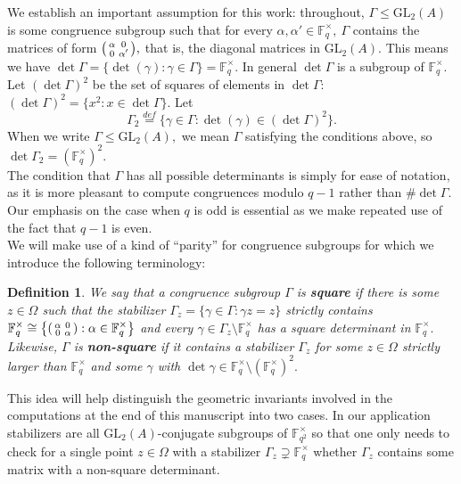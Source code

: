 \documentclass[11pt]{amsart}
\newtheorem{definition}[theorem]{Definition}
\theoremstyle{definition}
\newenvironment{psmallmatrix}
{\left(\begin{smallmatrix}}
	{\end{smallmatrix}\right)}
\numberwithin{equation}{section}
\newcommand{\GL}{\mathrm{GL}} 	%
\newcommand{\bbF}{\mathbb{F}}		%
\begin{document}
		We establish an important assumption for this work:
		throughout, $\Gamma\leq \GL_2(A)$ is some congruence subgroup such that 
		for every $\alpha,\alpha'\in \bbF_q^{\times},~\Gamma$ contains the matrices of form $\displaystyle{\begin{psmallmatrix}\alpha&0\\0&\alpha'\end{psmallmatrix}},$ that is, the diagonal matrices in $\GL_2(A).$ This means we have
		$\det\Gamma=\{\det(\gamma):\gamma\in \Gamma\}=\bbF_q^{\times}.$ In general $\det\Gamma$ is a subgroup of $\bbF_q^{\times}.$\\
		
		Let $(\det\Gamma)^2$ be the set of squares of elements in $\det\Gamma:$ $(\det\Gamma)^2=\{x^2: x\in \det\Gamma\}.$ Let \[\Gamma_2\overset{def}{=}\{\gamma\in \Gamma:\det(\gamma)\in (\det\Gamma)^2\}.\]
		When we write $\Gamma\leq \GL_2(A),$ we mean $\Gamma$ satisfying the conditions above, so $\det\Gamma_2=(\bbF_q^{\times})^2.$\\
		
		The condition that $\Gamma$ has all possible determinants is simply for ease of notation, as it is more pleasant to compute congruences modulo $q-1$ rather than $\#\det\Gamma.$ Our emphasis on the case when $q$ is odd is essential as we make repeated use of the fact that $q-1$ is even.\\ 

		We will make use of a kind of  ``parity'' for congruence subgroups for which we introduce the following terminology:
		\begin{definition}
			We say that a congruence subgroup $\Gamma$ is \textbf{square} if there is some $z\in \Omega$ such that the stabilizer $\Gamma_z=\{\gamma\in \Gamma: \gamma z=z\}$ strictly contains 
			$\displaystyle{\bbF_q^{\times}\cong \left\{\begin{psmallmatrix}\alpha&0\\0&\alpha\end{psmallmatrix}:\alpha\in \bbF_q^{\times}\right\}}$ and every $\gamma\in \Gamma_z\setminus \bbF_q^{\times}$ has a square determinant in $\bbF_q^{\times}.$ Likewise, $\Gamma$ is \textbf{non-square} if it contains a stabilizer $\Gamma_z$ for some $z\in \Omega$ strictly larger than $\bbF_q^{\times}$ and some $\gamma$ with $\det\gamma\in \bbF_q^{\times}\setminus (\bbF_q^{\times})^2.$
		\end{definition}
		
		This idea will help distinguish the geometric invariants involved in the computations at the end of this manuscript into two cases. In our application stabilizers are all $\GL_2(A)$-conjugate subgroups of $\bbF_{q^2}^{\times}$ so that one only needs to check for a single point $z\in \Omega$ with a stabilizer $\Gamma_z\supsetneq \bbF_q^{\times}$ whether $\Gamma_z$ contains some matrix with a non-square determinant.   
		
\end{document}
